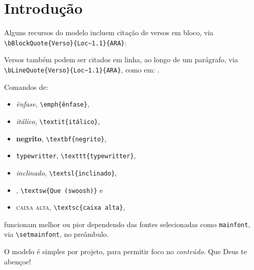 \tableofcontents



\section{Introdução}

    Alguns recursos do modelo incluem citação de versos em bloco, via \verb!\bBlockQuote{Verso}{Loc~1.1}{ARA}!:


    Versos também podem ser citados em linha, ao longo de um parágrafo, via  \verb!\bLineQuote{Verso}{Loc~1.1}{ARA}!,  como  em:
    .

    Comandos de:

    \begin{itemize}
        \item \emph{ênfase},            \verb!\emph{ênfase}!,
        \item \textit{itálico},         \verb!\textit{itálico}!,
        \item \textbf{negrito},         \verb!\textbf{negrito}!,
        \item \texttt{typewritter},     \verb!\texttt{typewritter}!,
        \item \textsl{inclinado},       \verb!\textsl{inclinado}!,
        \item {},    \verb!\textsw{Que (swoosh)}! e
        \item \textsc{caixa alta},      \verb!\textsc{caixa alta}!,
    \end{itemize}

    funcionam melhor ou pior dependendo das fontes selecionadas como \verb!mainfont!, via \verb!\setmainfont!, no preâmbulo.

    O modelo é simples por projeto, para permitir foco no \emph{conteúdo}. Que Deus te abençoe!


